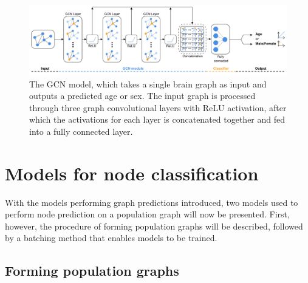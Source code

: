 %         

\begin{figure}[!htbp]
    \centering
    \includegraphics[width=\textwidth]{chapters/images_methods/base_v2.png}
    \caption{The GCN model, which takes a single brain graph as input and outputs a predicted age or sex. The input graph is processed through three graph convolutional layers with ReLU activation, after which the activations for each layer is concatenated together and fed into a fully connected layer.}
    \label{fig:gcn_base}
\end{figure}


\section{Models for node classification}

With the models performing graph predictions introduced, two models used to perform node prediction on a population graph will now be presented. First, however, the procedure of forming population graphs will be described, followed by a batching method that enables models to be trained.

\subsection{Forming population graphs}

